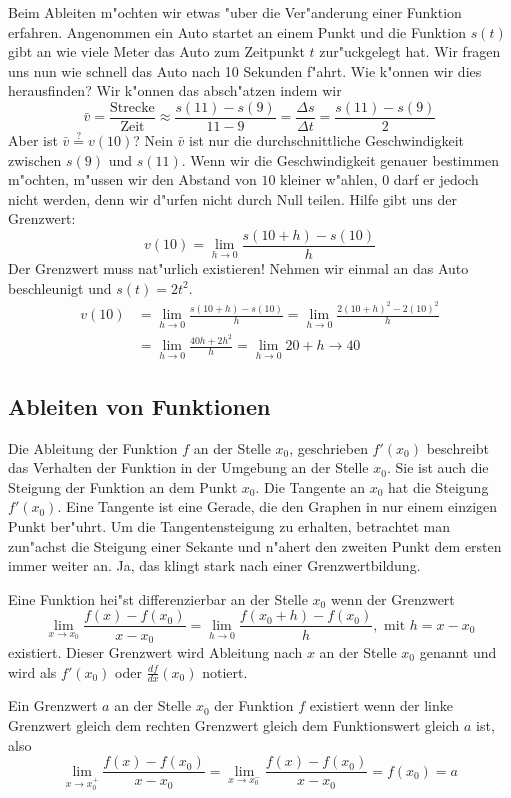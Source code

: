 Beim Ableiten m"ochten wir etwas "uber die Ver"anderung einer Funktion erfahren. Angenommen ein Auto startet an einem Punkt und die Funktion $s(t)$ gibt an wie viele Meter das Auto zum Zeitpunkt $t$ zur"uckgelegt hat. Wir fragen uns nun wie schnell das Auto nach 10 Sekunden f"ahrt. Wie k"onnen wir dies herausfinden? Wir k"onnen das absch"atzen indem wir 
\begin{equation*}
\bar{v} = \frac{\text{Strecke}}{\text{Zeit}} \approx \frac{s(11) - s(9)}{11 - 9} = \frac{\Delta s}{\Delta t} = \frac{s(11) - s(9)}{2}
\end{equation*}
Aber ist $\bar{v} \stackrel{?}{=} v(10)$? Nein $\bar{v}$ ist nur die durchschnittliche Geschwindigkeit zwischen $s(9)$ und $s(11)$. Wenn wir die Geschwindigkeit genauer bestimmen m"ochten, m"ussen wir den Abstand von $10$ kleiner w"ahlen, $0$ darf er jedoch nicht werden, denn wir d"urfen nicht durch Null teilen. Hilfe gibt uns der Grenzwert:
\begin{equation*}
v(10) = \lim\limits_{h \to 0} \frac{s(10+h) - s(10)}{h}
\end{equation*}
Der Grenzwert muss nat"urlich existieren! Nehmen wir einmal an das Auto beschleunigt und $s(t) = 2 t^2$.
\begin{align*}
v(10) &= \lim\limits_{h \to 0} \frac{s(10+h) - s(10)}{h} = \lim\limits_{h \to 0} \frac{2 (10+h)^2 - 2 (10)^2}{h}\\
&= \lim\limits_{h \to 0} \frac{40h + 2h^2}{h} = \lim\limits_{h \to 0} 20 + h \to 40
\end{align*}

\subsection{Ableiten von Funktionen}
Die Ableitung der Funktion $f$ an der Stelle $x_0$, geschrieben $f'(x_0)$ beschreibt das Verhalten der Funktion in der Umgebung an der Stelle $x_0$. Sie ist auch die Steigung der Funktion an dem Punkt $x_0$. Die Tangente an $x_0$ hat die Steigung $f'(x_0)$. Eine Tangente ist eine Gerade, die den Graphen in nur einem einzigen Punkt ber"uhrt. Um die Tangentensteigung zu erhalten, betrachtet man zun"achst die Steigung einer Sekante und n"ahert den zweiten Punkt dem ersten immer weiter an. Ja, das klingt stark nach einer Grenzwertbildung. 
\begin{definition}[Differenzierbarkeit in $x_0$]
Eine Funktion hei"st differenzierbar an der Stelle $x_0$ wenn der Grenzwert
\begin{equation*}
 \lim\limits_{x \to x_0} \frac{f(x)-f(x_0)}{x-x_0} = \lim\limits_{h \to 0}  \frac{f(x_0 + h)-f(x_0)}{h} , \text{ mit } h = x - x_0
\end{equation*}
existiert. Dieser Grenzwert wird Ableitung nach $x$ an der Stelle $x_0$ genannt und wird als $f'(x_0)$ oder $\frac{df}{dx}(x_0)$ notiert.
\end{definition}
Ein Grenzwert $a$ an der Stelle $x_0$ der Funktion $f$ existiert wenn der linke Grenzwert gleich dem rechten Grenzwert gleich dem Funktionswert gleich $a$ ist, also
\begin{equation*}
 \lim\limits_{x \to x_0^+} \frac{f(x)-f(x_0)}{x-x_0} =  \lim\limits_{x \to x_0^-} \frac{f(x)-f(x_0)}{x-x_0} = f(x_0) = a
\end{equation*}


